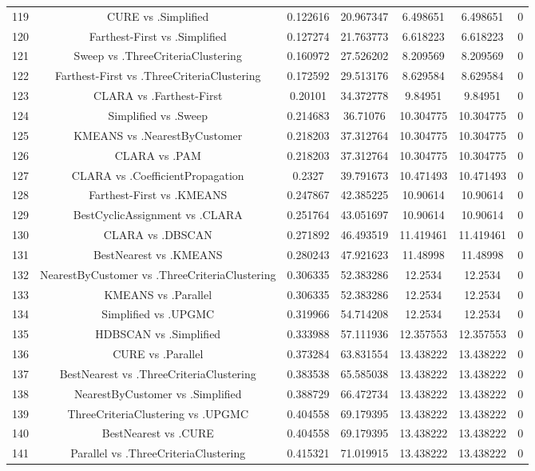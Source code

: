 \documentclass[a4paper,10pt]{article}
\begin{document}
\begin{landscape}
\begin{table}[!htp]
\begin{tabular}{ccccccc}
119&CURE vs .Simplified&0.122616&20.967347&6.498651&6.498651&0\\
120&Farthest-First vs .Simplified&0.127274&21.763773&6.618223&6.618223&0\\
121&Sweep vs .ThreeCriteriaClustering&0.160972&27.526202&8.209569&8.209569&0\\
122&Farthest-First vs .ThreeCriteriaClustering&0.172592&29.513176&8.629584&8.629584&0\\
123&CLARA vs .Farthest-First&0.20101&34.372778&9.84951&9.84951&0\\
124&Simplified vs .Sweep&0.214683&36.71076&10.304775&10.304775&0\\
125&KMEANS vs .NearestByCustomer&0.218203&37.312764&10.304775&10.304775&0\\
126&CLARA vs .PAM&0.218203&37.312764&10.304775&10.304775&0\\
127&CLARA vs .CoefficientPropagation&0.2327&39.791673&10.471493&10.471493&0\\
128&Farthest-First vs .KMEANS&0.247867&42.385225&10.90614&10.90614&0\\
129&BestCyclicAssignment vs .CLARA&0.251764&43.051697&10.90614&10.90614&0\\
130&CLARA vs .DBSCAN&0.271892&46.493519&11.419461&11.419461&0\\
131&BestNearest vs .KMEANS&0.280243&47.921623&11.48998&11.48998&0\\
132&NearestByCustomer vs .ThreeCriteriaClustering&0.306335&52.383286&12.2534&12.2534&0\\
133&KMEANS vs .Parallel&0.306335&52.383286&12.2534&12.2534&0\\
134&Simplified vs .UPGMC&0.319966&54.714208&12.2534&12.2534&0\\
135&HDBSCAN vs .Simplified&0.333988&57.111936&12.357553&12.357553&0\\
136&CURE vs .Parallel&0.373284&63.831554&13.438222&13.438222&0\\
137&BestNearest vs .ThreeCriteriaClustering&0.383538&65.585038&13.438222&13.438222&0\\
138&NearestByCustomer vs .Simplified&0.388729&66.472734&13.438222&13.438222&0\\
139&ThreeCriteriaClustering vs .UPGMC&0.404558&69.179395&13.438222&13.438222&0\\
140&BestNearest vs .CURE&0.404558&69.179395&13.438222&13.438222&0\\
141&Parallel vs .ThreeCriteriaClustering&0.415321&71.019915&13.438222&13.438222&0\\

\end{tabular}
\end{table}
\end{landscape}
\end{document}
